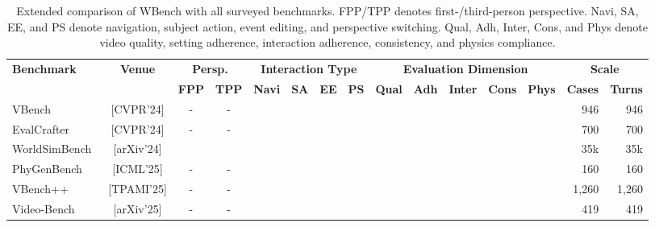 \documentclass{llmxive}
\providecommand{\pub}[1]{{\scriptsize{[{#1}]}}}
\providecommand{\thinslash}{\hspace{1pt}/\hspace{1pt}}
\providecommand{\cmark}{\ding{51}}
\providecommand{\xmark}{\ding{55}}
\providecommand{\arraystretch}{1.05}
\providecommand{\benchmark}{WBench }
\begin{document}
\begin{table}[!htbp]
\caption[Extended benchmark comparison]{Extended comparison of \benchmark with all surveyed benchmarks. FPP\thinslash TPP denotes first-\thinslash third-person perspective. Navi, SA, EE, and PS denote navigation, subject action, event editing, and perspective switching. Qual, Adh, Inter, Cons, and Phys denote video quality, setting adherence, interaction adherence, consistency, and physics compliance.}
\vspace{+3mm}
\label{tab:benchmark_comparison_full}
\centering
\renewcommand{\arraystretch}{1.3}
\footnotesize
\setlength{\tabcolsep}{3.5pt}
\begin{tabular}{@{}l c cc cccc ccccc rr@{}}
\toprule
\multirow{2.5}{*}{\textbf{Benchmark}} & \multirow{2.5}{*}{\textbf{Venue}} & \multicolumn{2}{c}{\textbf{Persp.}} & \multicolumn{4}{c}{\textbf{Interaction Type}} & \multicolumn{5}{c}{\textbf{Evaluation Dimension}} & \multicolumn{2}{c}{\textbf{Scale}} \\
\cmidrule(lr){3-4} \cmidrule(lr){5-8} \cmidrule(lr){9-13} \cmidrule(l){14-15}
& & \textbf{FPP} & \textbf{TPP} & \textbf{Navi} & \textbf{SA} & \textbf{EE} & \textbf{PS} & \textbf{Qual} & \textbf{Adh} & \textbf{Inter} & \textbf{Cons} & \textbf{Phys} & \textbf{Cases} & \textbf{Turns} \\
\midrule
VBench~\cite{huang2024vbench}                     & \pub{CVPR'24}    & - & - & \xmark & \xmark & \xmark & \xmark & \cmark & \xmark & \xmark & \xmark & \xmark & 946   & 946   \\
EvalCrafter~\cite{liu2024evalcrafter}             & \pub{CVPR'24}    & - & - & \xmark & \xmark & \xmark & \xmark & \cmark & \xmark & \xmark & \xmark & \xmark & 700   & 700   \\
WorldSimBench~\cite{lian2024worldsimbench}        & \pub{arXiv'24}   & \cmark & \xmark & \cmark & \cmark & \xmark & \xmark & \xmark & \xmark & \cmark & \cmark & \xmark & 35k   & 35k   \\
PhyGenBench~\cite{meng2024phygenbench}            & \pub{ICML'25}    & - & - & \xmark & \xmark & \xmark & \xmark & \cmark & \xmark & \xmark & \xmark & \cmark & 160   & 160   \\
VBench++~\cite{huang2024vbenchplus}               & \pub{TPAMI'25}   & - & - & \xmark & \xmark & \xmark & \xmark & \cmark & \xmark & \xmark & \xmark & \cmark & 1,260 & 1,260 \\
Video-Bench~\cite{han2025videobench}              & \pub{arXiv'25}   & - & - & \xmark & \xmark & \xmark & \xmark & \cmark & \xmark & \xmark & \xmark & \xmark & 419   & 419   \\

\end{tabular}
\end{table}
\end{document}
